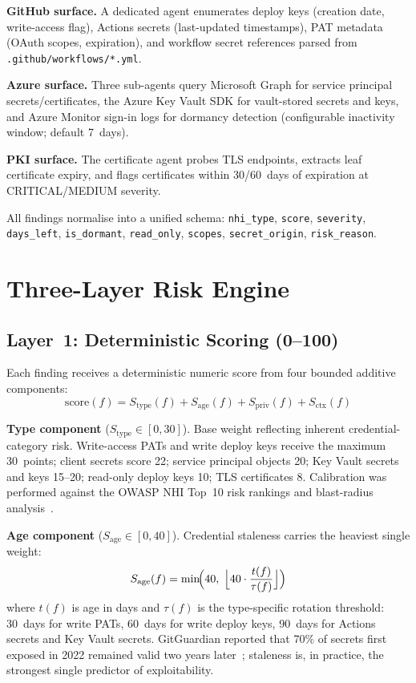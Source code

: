 \documentclass[journal]{IEEEtran}
\begin{document}
\textbf{GitHub surface.} A dedicated agent enumerates deploy keys (creation date, write-access flag), Actions secrets (last-updated timestamps), PAT metadata (OAuth scopes, expiration), and workflow secret references parsed from \texttt{.github/workflows/*.yml}.

\textbf{Azure surface.} Three sub-agents query Microsoft Graph for service principal secrets/certificates, the Azure Key Vault SDK for vault-stored secrets and keys, and Azure Monitor sign-in logs for dormancy detection (configurable inactivity window; default 7~days).

\textbf{PKI surface.} The certificate agent probes TLS endpoints, extracts leaf certificate expiry, and flags certificates within 30/60~days of expiration at CRITICAL/MEDIUM severity.

All findings normalise into a unified schema: \texttt{nhi\_type}, \texttt{score}, \texttt{severity}, \texttt{days\_left}, \texttt{is\_dormant}, \texttt{read\_only}, \texttt{scopes}, \texttt{secret\_origin}, \texttt{risk\_reason}.

\section{Three-Layer Risk Engine}
\label{sec:risk}

\subsection{Layer~1: Deterministic Scoring (0--100)}

Each finding receives a deterministic numeric score from four bounded additive components:
\begin{equation}
  \mathrm{score}(f) = S_{\mathrm{type}}(f) + S_{\mathrm{age}}(f) + S_{\mathrm{priv}}(f) + S_{\mathrm{ctx}}(f)
  \label{eq:score}
\end{equation}

\textbf{Type component} ($S_{\mathrm{type}} \in [0, 30]$). Base weight reflecting inherent credential-category risk. Write-access PATs and write deploy keys receive the maximum 30~points; client secrets score 22; service principal objects 20; Key Vault secrets and keys 15--20; read-only deploy keys 10; TLS certificates 8. Calibration was performed against the OWASP NHI Top~10 risk rankings and blast-radius analysis~\cite{owaspnhi2025}.

\textbf{Age component} ($S_{\mathrm{age}} \in [0, 40]$). Credential staleness carries the heaviest single weight:
\begin{equation}
  S_{\mathrm{age}}(f) = \min\!\Bigl(40,\; \Bigl\lfloor 40 \cdot \frac{t(f)}{\tau(f)} \Bigr\rfloor\Bigr)
  \label{eq:age}
\end{equation}
where $t(f)$ is age in days and $\tau(f)$ is the type-specific rotation threshold: 30~days for write PATs, 60~days for write deploy keys, 90~days for Actions secrets and Key Vault secrets. GitGuardian reported that 70\% of secrets first exposed in 2022 remained valid two years later~\cite{gitguardian2024}; staleness is, in practice, the strongest single predictor of exploitability.
\end{document}
